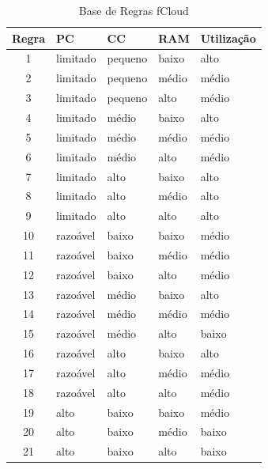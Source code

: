 \documentclass[tcc,capa]{texufpel}
\begin{document}
\begin{table}[h]
\centering
\caption{Base de Regras fCloud}
\begin{tabular}{|c||l|l|l|l|}
\hline
\textbf{Regra} & \textbf{PC} & \textbf{CC} & \textbf{RAM} & \textbf{Utilização} \\ \hline \hline
1 &   limitado     &   pequeno   &   baixo     &  alto        \\ \hline
2 &   limitado    &   pequeno   &   médio   &  médio    \\ \hline
3 &   limitado    &   pequeno   &   alto       &  médio \\ \hline
4 &   limitado    &     médio    &   baixo      &  alto \\ \hline
5 &   limitado    &     médio    &   médio    & médio   \\ \hline
6 &   limitado   &      médio    &   alto      &  médio      \\ \hline
7 &   limitado     &        alto       &   baixo   &  alto   \\ \hline
8 &   limitado    &        alto       &   médio  &  alto    \\ \hline
9 &   limitado    &        alto       &   alto      &  alto    \\ \hline
10 &   razoável    &      baixo     &   baixo     &   médio  \\ \hline
11 &   razoável    &      baixo     &   médio   &   médio  \\ \hline
12 &   razoável    &      baixo     &   alto       &   médio  \\ \hline
13 &   razoável    &     médio    &   baixo     &   alto      \\ \hline
14 &   razoável    &     médio    &   médio   &   médio    \\ \hline
15 &   razoável     &     médio    &   alto       &   baixo    \\ \hline
16 &   razoável    &       alto      &   baixo     &   alto    \\ \hline
17 &   razoável     &       alto      &   médio   &   médio    \\ \hline
18 &   razoável     &       alto      &   alto       &   médio   \\ \hline
19 &      alto         &      baixo     &    baixo    &   médio    \\ \hline
20 &      alto         &      baixo     &   médio    &   baixo   \\ \hline
21 &      alto         &      baixo     &     alto      &   baixo   \\ \hline

\end{tabular}
\end{table}
\end{document}
